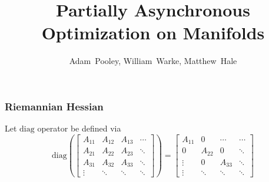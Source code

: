 \documentclass[letterpaper, 10 pt, conference, onecolumn]{ieeeconf}
\title{\LARGE \bf
Partially Asynchronous Optimization on Manifolds
}
\author{Adam~Pooley, William~Warke, Matthew~Hale}
\theoremstyle{definition}
\theoremstyle{plain}
\begin{document}
    
\maketitle

\newcommand{\R}[1]{\mathbb{R}^{#1}}
\newcommand{\N}[1]{\mathbb{N}^{#1}}
\newcommand{\Z}[1]{\mathbb{Z}^{#1}}
\newcommand{\seq}[1]{[#1]}

\newcommand{\norm}[1]{\left\lVert #1 \right\rVert}
\newcommand{\grad}{\text{grad}}
\newcommand{\Hess}{\text{Hess}}
\newcommand{\diff}{\text{D}}
\newcommand{\fracpart}[2]{\frac{\partial #1}{\partial #2}}
\newcommand{\fracder}[2]{\frac{d #1}{d #2}}
\newcommand{\superth}[1]{\ensuremath{#1^{\text{th}}}}
\newcommand{\dist}{\text{dist}}
\newcommand{\inj}{\text{inj}}
\newcommand{\Exp}{\text{Exp}}
\newcommand{\Log}{\text{Log}}
\newcommand{\trace}{\text{Tr}}
\newcommand{\maxzero}[1]{[#1]^+}
\newcommand{\from}{\leftarrow}
\newcommand{\diag}{\text{diag}}
\newcommand{\ddiag}{\text{ddiag}}

\newcommand{\zero}[1]{\mathbf{0}^{#1}}
\newcommand{\eye}[1]{\mathbf{I}^{#1}}

\newcommand{\delay}{\tau}

\tableofcontents
\newpage





\subsubsection{Riemannian Hessian}
Let $\text{diag}$ operator be defined via
\begin{equation}
    \text{diag}\left(\begin{bmatrix}
        A_{11} & A_{12} & A_{13} & \cdots \\
        A_{21} & A_{22} & A_{23} & \ddots \\
        A_{31} & A_{32} & A_{33} & \ddots \\
        \vdots & \ddots & \ddots & \ddots
    \end{bmatrix}\right) = \begin{bmatrix}
        A_{11} & 0 & \cdots & \cdots \\
        0 & A_{22} & 0 & \ddots \\
        \vdots & 0 & A_{33} & \ddots \\
        \vdots & \ddots & \ddots & \ddots
    \end{bmatrix}
\end{equation}
\end{document}

